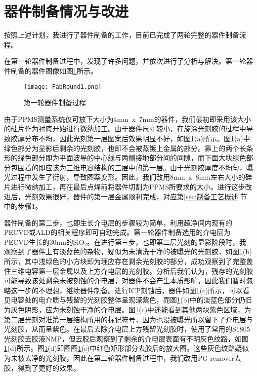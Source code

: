             \section{器件制备情况与改进} %
            \label{sec:器件制备情况与改进}
                按照上述计划，我进行了器件制备的工作，目前已完成了两轮完整的器件制备流程。

                在第一轮器件制备过程中，发现了许多问题，并依次进行了分析与解决。第一轮器件制备的器件图像如图\ref{fig:FabRound1}所示。

            \begin{figure}[h]
                \centering
                \texttt{[image: FabRound1.png]}
                \caption{第一轮器件制备过程}
                \label{fig:FabRound1}
            \end{figure}

            由于PPMS测量系统仅可放下大小为4mm~x~7mm的器件，我们最初即采用该大小的硅片作为衬底开始进行微纳加工。由于器件尺寸较小，在旋涂光刻胶的过程中导致胶厚分布不均，因此光刻第一层图案后效果明显不好，如图\ref{fig:FabRound1}(a)所示。图\ref{fig:FabRound1}(a)中绿色部分为显影后剩余的光刻胶，也即不会被蒸镀上金属的部分。靠上的两个长条形的绿色部分即为平面波导的中心线与两侧接地部分间的间隙，而下面大块绿色部分包围着的即应该为三维电容结构的三层中的第一层。由于光刻胶厚度不均匀，曝光过程中发生了衍射，导致图案变形。因此，我们改用8mm~x~8mm左右大小的硅片进行微纳加工，再在最后点焊前将器件切割为PPMS所要求的大小。进行这步改进后，光刻效果很好，器件的第一层金属顺利完成，对应第\ref{sec:制备工艺概述}节中的步骤1。

            器件制备的第二步，也即生长介电层的步骤较为简单，利用超净间内现有的PECVD或ALD的相关程序即可自动完成。第一轮器件制备选用的介电层为PECVD生长的30nm的SiO$_2$。在进行第三步，也即第二层光刻的显影阶段时，我观察到了器件上有淡蓝色的杂物，疑似为未清洗干净的被曝光的光刻胶，如图\ref{fig:FabRound1}(b)所示，其中浅绿色的小方块即为理应存在剩余光刻胶的部分，成功观察到了完整盖住三维电容第一层金属以及上方介电层的光刻胶。分析后我们认为，残存的光刻胶可能导致该处剩余未被刻蚀的介电层，对器件不会产生本质影响，因此我们暂时忽略这一步的不理想，继续器件制备。进行ICP刻蚀后，器件如图\ref{fig:FabRound1}(c)所示，可以看见电容处的电介质与残留的光刻胶整体呈现深紫色，而图\ref{fig:FabRound1}(b)中的淡蓝色部分仍旧为灰色阴影，应为未刻蚀干净的介电层。图\ref{fig:FabRound1}(c)中还能看到其他两块紫色区域，为第二层光刻对准第一层结构所用的标记符号，因为也没被曝光所以留下了介电层与光刻胶，从而呈紫色。在最后去除介电层上方残留光刻胶时，使用了常用的S1805光刻胶去胶液NMP，但去胶后观察到了剩余的介电层表面有不明灰色纹路，如图\ref{fig:FabRound1}(d)所示。图\ref{fig:FabRound1}(d)即图图\ref{fig:FabRound1}(c)中红色矩形部分去胶后的放大图。这些灰色纹路疑似为未被去净的光刻胶，因此在第二轮器件制备过程中，我们改用PG remover去胶，得到了更好的效果。

